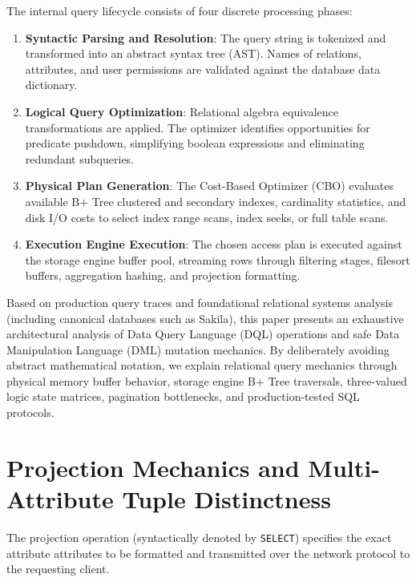\documentclass[10pt,journal,compsoc,onecolumn]{IEEEtran}
\begin{document}
The internal query lifecycle consists of four discrete processing phases:
\begin{enumerate}
    \item \textbf{Syntactic Parsing and Resolution}: The query string is tokenized and transformed into an abstract syntax tree (AST). Names of relations, attributes, and user permissions are validated against the database data dictionary.
    \item \textbf{Logical Query Optimization}: Relational algebra equivalence transformations are applied. The optimizer identifies opportunities for predicate pushdown, simplifying boolean expressions and eliminating redundant subqueries.
    \item \textbf{Physical Plan Generation}: The Cost-Based Optimizer (CBO) evaluates available B+ Tree clustered and secondary indexes, cardinality statistics, and disk I/O costs to select index range scans, index seeks, or full table scans.
    \item \textbf{Execution Engine Execution}: The chosen access plan is executed against the storage engine buffer pool, streaming rows through filtering stages, filesort buffers, aggregation hashing, and projection formatting.
\end{enumerate}

Based on production query traces and foundational relational systems analysis (including canonical databases such as Sakila), this paper presents an exhaustive architectural analysis of Data Query Language (DQL) operations and safe Data Manipulation Language (DML) mutation mechanics. By deliberately avoiding abstract mathematical notation, we explain relational query mechanics through physical memory buffer behavior, storage engine B+ Tree traversals, three-valued logic state matrices, pagination bottlenecks, and production-tested SQL protocols.

\section{Projection Mechanics and Multi-Attribute Tuple Distinctness}
\label{sec:projection}

The projection operation (syntactically denoted by \texttt{SELECT}) specifies the exact attribute attributes to be formatted and transmitted over the network protocol to the requesting client.
\end{document}
